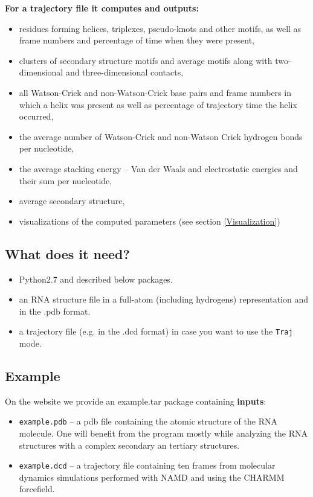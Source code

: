 \documentclass[12pt]{article}
\begin{document}
\textbf{For a trajectory file it computes and outputs:}
\begin{itemize}
\item residues forming helices, triplexes, pseudo-knots and other motifs, as well as frame numbers and percentage of time when they were present, \item clusters of secondary structure motifs and average motifs along with two-dimensional and three-dimensional contacts,
\item all Watson-Crick and non-Watson-Crick base pairs and frame numbers in which a helix was present as well as percentage of trajectory time the helix occurred,
\item the average number of Watson-Crick and non-Watson Crick hydrogen bonds per nucleotide,
\item the average stacking energy -- Van der Waals and electrostatic energies and their sum per nucleotide,
\item average secondary structure,
\item visualizations of the computed parameters (see section \ref{Visualization})
\end{itemize}

\subsection{What does it need?}
\begin{itemize}
\item Python2.7 and described below packages.
\item an RNA structure file in a full-atom (including hydrogens) representation and in the .pdb format.
\item a trajectory file (e.g. in the .dcd format) in case you want to use the \texttt{Traj} mode.
\end{itemize}

\subsection{Example}
On the website we provide an example.tar package containing \textbf{inputs}:
\begin{itemize}
\item \texttt{example.pdb}  -- a pdb file containing the atomic structure of the RNA molecule. One will benefit from the program mostly while analyzing the RNA structures with a complex secondary an tertiary structures.
\item \texttt{example.dcd}  -- a trajectory file containing ten frames from molecular dynamics simulations performed with NAMD \cite{Phillips2005} and using the CHARMM forcefield.
\end{itemize}
\end{document}
